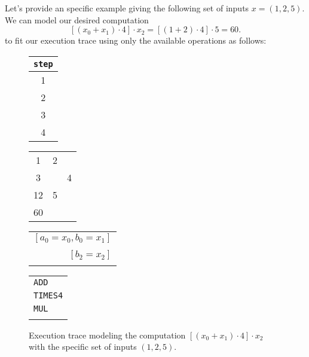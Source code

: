 Let's provide an specific example giving the following set of inputs $x=(1,2,5)$. We can model our desired computation
\[
[(x_0+x_1)\cdot 4] \cdot x_2 = [(1+2)\cdot 4] \cdot 5 = 60.
\]
to fit our execution trace using only the available operations as follows:
\vspace{0.3cm}
\begin{large}
\begin{figure}[h!]

\centering

\begin{tabular}{|c|}
\hline
\texttt{step} \\ \hline
1  \\ \hline
2  \\ \hline
3 \\ \hline
4 \\ \hline
\end{tabular}
\hspace{0mm}
\begin{tabular}{|c|c|c|}
\hline
\A & \B & \cellcolor{lightgray} \C \\ \hline
1 & 2 & \cellcolor{lightgray} \\ \hline
3 & & \cellcolor{lightgray} 4 \\ \hline
12 & 5 & \cellcolor{lightgray} \\ \hline
60 & & \cellcolor{lightgray} \\ \hline
\end{tabular}
\hspace{1mm}
\begin{tabular}{r}
\\
$[a_0=x_0, b_0=x_1]$  \\
\\
$[b_2 = x_2]$         \\
\\
\end{tabular}
\hspace{1em}
\begin{tabular}{l}
\\
\texttt{ADD} \\
\texttt{TIMES4} \\
\texttt{MUL} \\
\\
\end{tabular}

\caption{Execution trace modeling the computation $[(x_0+x_1)\cdot 4] \cdot x_2$ with the specific set of inputs $(1, 2, 5)$. }
\label{fig:example-execution-trace}

\end{figure}
\end{large}

